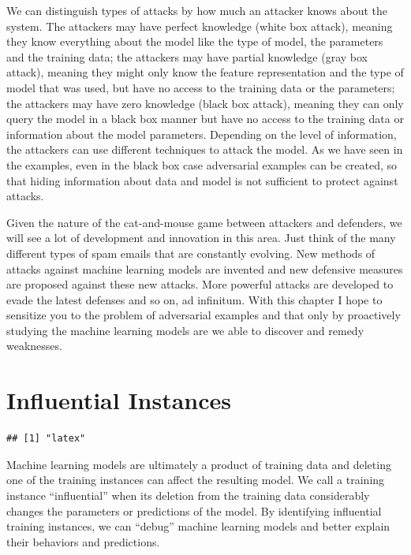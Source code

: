 \documentclass[
  11pt,
]{scrbook}
\begin{document}
We can distinguish types of attacks by how much an attacker knows about the system.
The attackers may have perfect knowledge (white box attack), meaning they know everything about the model like the type of model, the parameters and the training data;
the attackers may have partial knowledge (gray box attack), meaning they might only know the feature representation and the type of model that was used, but have no access to the training data or the parameters;
the attackers may have zero knowledge (black box attack), meaning they can only query the model in a black box manner but have no access to the training data or information about the model parameters.
Depending on the level of information, the attackers can use different techniques to attack the model.
As we have seen in the examples, even in the black box case adversarial examples can be created, so that hiding information about data and model is not sufficient to protect against attacks.

Given the nature of the cat-and-mouse game between attackers and defenders, we will see a lot of development and innovation in this area.
Just think of the many different types of spam emails that are constantly evolving.
New methods of attacks against machine learning models are invented and new defensive measures are proposed against these new attacks.
More powerful attacks are developed to evade the latest defenses and so on, ad infinitum.
With this chapter I hope to sensitize you to the problem of adversarial examples and that only by proactively studying the machine learning models are we able to discover and remedy weaknesses.

\newpage

\hypertarget{influential}{%
\section{Influential Instances}\label{influential}}

\begin{verbatim}
## [1] "latex"
\end{verbatim}

Machine learning models are ultimately a product of training data and deleting one of the training instances can affect the resulting model.
We call a training instance ``influential'' when its deletion from the training data considerably changes the parameters or predictions of the model.
By identifying influential training instances, we can ``debug'' machine learning models and better explain their behaviors and predictions.
\end{document}

